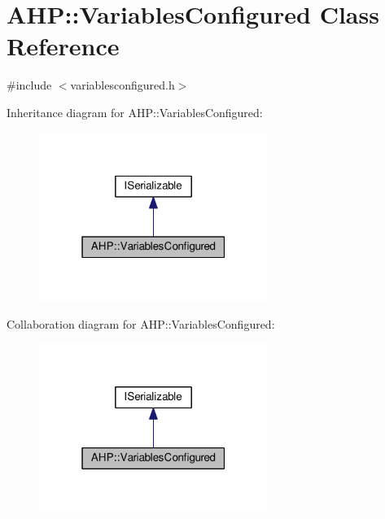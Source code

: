 \hypertarget{class_a_h_p_1_1_variables_configured}{}\section{A\+H\+P\+:\+:Variables\+Configured Class Reference}
\label{class_a_h_p_1_1_variables_configured}


{\ttfamily \#include $<$variablesconfigured.\+h$>$}



Inheritance diagram for A\+H\+P\+:\+:Variables\+Configured\+:
\nopagebreak
\begin{figure}[H]
\begin{center}
\leavevmode
\includegraphics[width=211pt]{class_a_h_p_1_1_variables_configured__inherit__graph}
\end{center}
\end{figure}


Collaboration diagram for A\+H\+P\+:\+:Variables\+Configured\+:
\nopagebreak
\begin{figure}[H]
\begin{center}
\leavevmode
\includegraphics[width=211pt]{class_a_h_p_1_1_variables_configured__coll__graph}
\end{center}
\end{figure}
